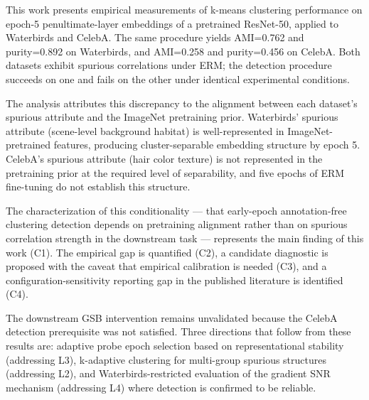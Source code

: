 
This work presents empirical measurements of k-means clustering performance on epoch-5 penultimate-layer embeddings of a pretrained ResNet-50, applied to Waterbirds and CelebA. The same procedure yields AMI=0.762 and purity=0.892 on Waterbirds, and AMI=0.258 and purity=0.456 on CelebA. Both datasets exhibit spurious correlations under ERM; the detection procedure succeeds on one and fails on the other under identical experimental conditions.

The analysis attributes this discrepancy to the alignment between each dataset's spurious attribute and the ImageNet pretraining prior. Waterbirds' spurious attribute (scene-level background habitat) is well-represented in ImageNet-pretrained features, producing cluster-separable embedding structure by epoch 5. CelebA's spurious attribute (hair color texture) is not represented in the pretraining prior at the required level of separability, and five epochs of ERM fine-tuning do not establish this structure.

The characterization of this conditionality — that early-epoch annotation-free clustering detection depends on pretraining alignment rather than on spurious correlation strength in the downstream task — represents the main finding of this work (C1). The empirical gap is quantified (C2), a candidate diagnostic is proposed with the caveat that empirical calibration is needed (C3), and a configuration-sensitivity reporting gap in the published literature is identified (C4).

The downstream GSB intervention remains unvalidated because the CelebA detection prerequisite was not satisfied. Three directions that follow from these results are: adaptive probe epoch selection based on representational stability (addressing L3), k-adaptive clustering for multi-group spurious structures (addressing L2), and Waterbirds-restricted evaluation of the gradient SNR mechanism (addressing L4) where detection is confirmed to be reliable.

